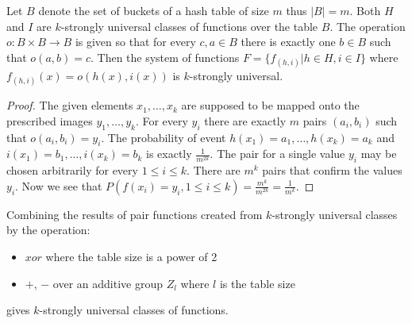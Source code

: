 \begin{theorem}
Let $B$ denote the set of buckets of a hash table of size $m$ thus $|B| = m$. Both $H$ and $I$ are $k$-strongly universal classes of functions over the table $B$. The operation $o: B \times B \rightarrow B$ is given so that for every $c, a \in B$ there is exactly one $b \in B$ such that $o(a, b) = c$. Then the system of functions $F = \lbrace f_{(h, i)} | h \in H, i \in I \rbrace$ where $f_{(h, i)}(x) = o(h(x), i(x))$ is $k$-strongly universal.
\end{theorem}
\begin{proof}
The given elements $x_1, \dots, x_k$ are supposed to be mapped onto the prescribed images $y_1, \dots, y_k$. For every $y_i$ there are exactly $m$ pairs $(a_i, b_i)$ such that $o(a_i, b_i) = y_i$. The probability of event $h(x_1) = a_1, \dots, h(x_k) = a_k$ and $i(x_1) = b_1, \dots, i(x_k) = b_k$ is exactly $\frac{1}{m^{2k}}$. The pair for a single value $y_i$ may be chosen arbitrarily for every $1 \le i \le k$. There are $m^k$ pairs that confirm the values $y_i$. Now we see that $P(f(x_i) = y_i, 1 \le i \le k) = \frac{m^k}{m^{2k}} = \frac{1}{m^k}$.
\end{proof}

\begin{corollary}
Combining the results of pair functions created from $k$-strongly universal classes by the operation:
\begin{itemize}
\item $xor$ where the table size is a power of 2
\item $+$, $-$ over an additive group $Z_l$ where $l$ is the table size
\end{itemize}
gives $k$-strongly universal classes of functions.
\end{corollary}

